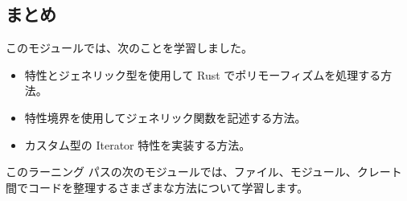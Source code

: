 \subsection{まとめ}

このモジュールでは、次のことを学習しました。

\begin{itemize}
\item 特性とジェネリック型を使用して Rust でポリモーフィズムを処理する方法。
\item 特性境界を使用してジェネリック関数を記述する方法。
\item カスタム型の Iterator 特性を実装する方法。
\end{itemize}

このラーニング パスの次のモジュールでは、ファイル、モジュール、クレート間でコードを整理するさまざまな方法について学習します。